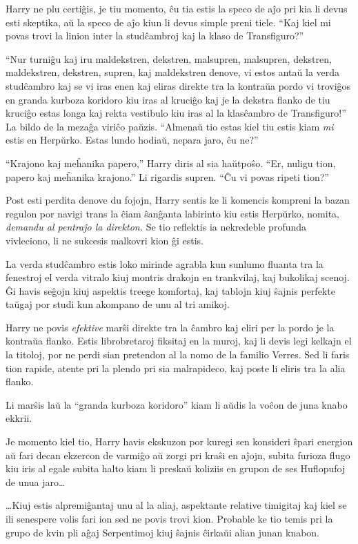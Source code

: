 Harry ne plu certiĝis, je tiu momento, ĉu tia estis la speco de aĵo pri kia li
devus esti skeptika, aŭ la speco de aĵo kiun li devus simple preni tiele. ``Kaj
kiel mi povas trovi la linion inter la studĉambroj kaj la klaso de
Transfiguro?''

``Nur turniĝu kaj iru maldekstren, dekstren, malsupren, malsupren, dekstren,
maldekstren, dekstren, supren, kaj maldekstren denove, vi estos antaŭ la verda
studĉambro kaj se vi iras enen kaj eliras direkte tra la kontraŭa pordo vi
troviĝos en granda kurboza koridoro kiu iras al kruciĝo kaj je la dekstra flanko
de tiu kruciĝo estas longa kaj rekta vestibulo kiu iras al la klasĉambro de
Transfiguro!'' La bildo de la mezaĝa viriĉo paŭzis. ``Almenaŭ tio estas kiel tiu
estis kiam \emph{mi} estis en Herpŭrko. Estas lundo hodiaŭ, nepara jaro, ĉu
ne?''

``Krajono kaj meĥanika papero,'' Harry diris al sia haŭtpoŝo. ``Er,
nuligu tion, papero kaj meĥanika krajono.'' Li rigardis supren. ``Ĉu
vi povas ripeti tion?''

Post esti perdita denove du fojojn, Harry sentis ke li komencis kompreni la bazan
regulon por navigi trans la ĉiam ŝanĝanta labirinto kiu estis Herpŭrko, nomita,
\emph{demandu al pentraĵo la direkton.} Se tio reflektis ia nekredeble profunda
vivleciono, li ne sukcesis malkovri kion ĝi estis.

La verda studĉambro estis loko mirinde agrabla kun sunlumo fluanta tra
la fenestroj el verda vitralo kiuj montris drakojn en trankvilaj, kaj
bukolikaj scenoj. Ĝi havis seĝojn kiuj aspektis treege komfortaj, kaj
tablojn kiuj ŝajnis perfekte taŭgaj por studi kun akompano de unu al
tri amikoj. 

Harry ne povis \emph{efektive} marŝi direkte tra la ĉambro kaj eliri per la
pordo je la kontraŭa flanko. Estis librobretaroj fiksitaj en la muroj, kaj li
devis legi kelkajn el la titoloj, por ne perdi sian pretendon al la nomo de la
familio Verres. Sed li faris tion rapide, atente pri la plendo pri sia
malrapideco, kaj poste li eliris tra la alia flanko.

Li marŝis laŭ la ``granda kurboza koridoro'' kiam li aŭdis la voĉon de
juna knabo ekkrii.

Je momento kiel tio, Harry havis ekskuzon por kuregi sen konsideri ŝpari
energion aŭ fari decan ekzercon de varmiĝo aŭ zorgi pri kraŝi en aĵojn, subita
furioza flugo kiu iris al egale subita halto kiam li preskaŭ koliziis en
grupon de ses Huflopufoj de unua jaro\ldots

\ldots Kiuj estis alpremiĝantaj unu al la aliaj, aspektante relative timigitaj
kaj kiel se ili senespere volis fari ion sed ne povis trovi kion. Probable ke
tio temis pri la grupo de kvin pli aĝaj Serpentimoj kiuj ŝajnis ĉirkaŭi alian
junan knabon.

